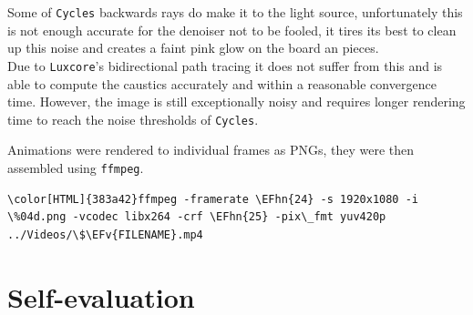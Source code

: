 \documentclass[11pt]{article}
\newcommand{\EFv}[1]{\textcolor{EFv}{#1}} %
\newcommand{\EFhn}[1]{\textcolor{EFhn}{\textbf{#1}}} %
\begin{document}
Some of \texttt{Cycles} backwards rays do make it to the light source, unfortunately
this is not enough accurate for the denoiser not to be fooled, it tires its best
to clean up this noise and creates a faint pink glow on the board an pieces.\\

Due to \texttt{Luxcore}'s bidirectional path tracing it does not suffer from this and
is able to compute the caustics accurately and within a reasonable convergence
time. However, the image is still exceptionally noisy and requires longer
rendering time to reach the noise thresholds of \texttt{Cycles}.

Animations were rendered to individual frames as PNGs, they were then assembled
using \texttt{ffmpeg}.
\begin{Code}
\begin{Verbatim}[]
\color[HTML]{383a42}ffmpeg -framerate \EFhn{24} -s 1920x1080 -i \%04d.png -vcodec libx264 -crf \EFhn{25} -pix\_fmt yuv420p ../Videos/\$\EFv{FILENAME}.mp4
\end{Verbatim}
\end{Code}
\section{Self-evaluation}
\label{sec:org43f0967}
\end{document}
